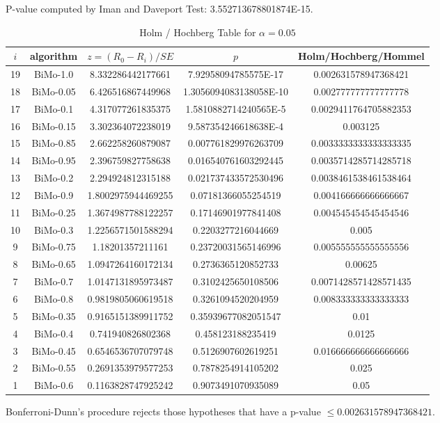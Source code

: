 \documentclass[a4paper,10pt]{article}
\begin{document}
\begin{landscape}
P-value computed by Iman and Daveport Test: 3.552713678801874E-15.\newline

\begin{table}[!htp]
\centering\tiny
\caption{Holm / Hochberg Table for $\alpha=0.05$}
\begin{tabular}{ccccc}
$i$&algorithm&$z=(R_0 - R_i)/SE$&$p$&Holm/Hochberg/Hommel\\
\hline
19&BiMo-1.0&8.332286442177661&7.92958094785575E-17&0.002631578947368421\\
18&BiMo-0.05&6.426516867449968&1.3056094083138058E-10&0.002777777777777778\\
17&BiMo-0.1&4.317077261835375&1.5810882714240565E-5&0.0029411764705882353\\
16&BiMo-0.15&3.302364072238019&9.587354246618638E-4&0.003125\\
15&BiMo-0.85&2.662258260879087&0.007761829976263709&0.0033333333333333335\\
14&BiMo-0.95&2.396759827758638&0.016540761603292445&0.0035714285714285718\\
13&BiMo-0.2&2.294924812315188&0.021737433572530496&0.0038461538461538464\\
12&BiMo-0.9&1.8002975944469255&0.07181366055254519&0.004166666666666667\\
11&BiMo-0.25&1.3674987788122257&0.17146901977841408&0.004545454545454546\\
10&BiMo-0.3&1.2256571501588294&0.2203277216044669&0.005\\
9&BiMo-0.75&1.18201357211161&0.23720031565146996&0.005555555555555556\\
8&BiMo-0.65&1.0947264160172134&0.2736365120852733&0.00625\\
7&BiMo-0.7&1.0147131895973487&0.3102425650108506&0.0071428571428571435\\
6&BiMo-0.8&0.9819805060619518&0.3261094520204959&0.008333333333333333\\
5&BiMo-0.35&0.9165151389911752&0.35939677082051547&0.01\\
4&BiMo-0.4&0.741940826802368&0.458123188235419&0.0125\\
3&BiMo-0.45&0.6546536707079748&0.5126907602619251&0.016666666666666666\\
2&BiMo-0.55&0.2691353979577253&0.7878254914105202&0.025\\
1&BiMo-0.6&0.1163828747925242&0.9073491070935089&0.05\\
\hline
\end{tabular}
\end{table}
Bonferroni-Dunn's procedure rejects those hypotheses that have a p-value $\le0.002631578947368421$.



\end{landscape}
\end{document}
